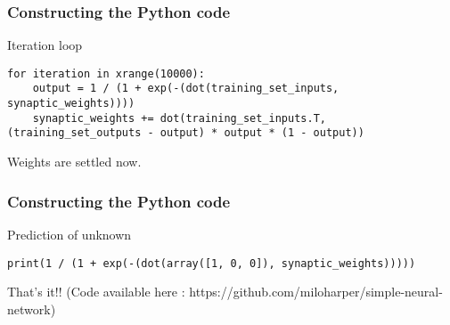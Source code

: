 \begin{frame}[fragile] \frametitle{Constructing the Python code}
Iteration loop
\begin{lstlisting}
for iteration in xrange(10000):
    output = 1 / (1 + exp(-(dot(training_set_inputs, synaptic_weights))))
    synaptic_weights += dot(training_set_inputs.T, (training_set_outputs - output) * output * (1 - output))
\end{lstlisting}
Weights are settled now.
\end{frame}

\begin{frame}[fragile] \frametitle{Constructing the Python code}
Prediction of unknown
\begin{lstlisting}
print(1 / (1 + exp(-(dot(array([1, 0, 0]), synaptic_weights)))))
\end{lstlisting}
That's it!!
{\tiny (Code available here : https://github.com/miloharper/simple-neural-network)}
\end{frame}